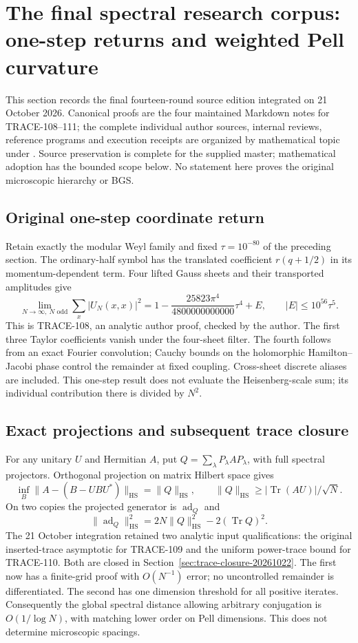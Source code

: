\section{The final spectral research corpus: one-step returns and weighted Pell curvature}
\label{sec:spectral-final-20261021}

This section records the final fourteen-round source edition integrated on
21 October 2026. Canonical proofs are the four maintained Markdown notes
for TRACE-108--111; the complete individual author sources, internal reviews,
reference programs and execution receipts are organized by mathematical topic
under . Source preservation is complete
for the supplied master; mathematical adoption has the bounded scope below.
No statement here proves the original microscopic hierarchy or BGS.

\subsection{Original one-step coordinate return}
Retain exactly the modular Weyl family and fixed $\tau=10^{-80}$ of the
preceding section. The ordinary-half symbol has the translated coefficient
$r(q+1/2)$ in its momentum-dependent term. Four lifted Gauss sheets and
their transported amplitudes give
\[
\lim_{N\to\infty,\ N\text{ odd}}\sum_x|U_N(x,x)|^2
=1-\frac{25823\pi^4}{4800000000000}\tau^4+E,
\qquad |E|\le10^{56}\tau^5.
\]
This is TRACE-108, an analytic author proof, checked by the author. The first three
Taylor coefficients vanish under the four-sheet filter. The fourth follows
from an exact Fourier convolution; Cauchy bounds on the holomorphic
Hamilton--Jacobi phase control the remainder at fixed coupling. Cross-sheet
discrete aliases are included. This one-step result does not evaluate the
Heisenberg-scale sum; its individual contribution there is divided by $N^2$.

\subsection{Exact projections and subsequent trace closure}
For any unitary $U$ and Hermitian $A$, put
$Q=\sum_\lambda P_\lambda AP_\lambda$, with full spectral projectors.
Orthogonal projection on matrix Hilbert space gives
\[
\inf_B\|A-(B-UBU^*)\|_{\mathrm{HS}}=\|Q\|_{\mathrm{HS}},\qquad
\|Q\|_{\mathrm{HS}}\ge |\operatorname{Tr}(AU)|/\sqrt N.
\]
On two copies the projected generator is $\operatorname{ad}_Q$ and
\[
\|\operatorname{ad}_Q\|_{\mathrm{HS}}^2
=2N\|Q\|_{\mathrm{HS}}^2-2(\operatorname{Tr}Q)^2.
\]
The 21 October integration retained two analytic input qualifications:
the original inserted-trace asymptotic for TRACE-109 and the uniform
power-trace bound for TRACE-110. Both are closed in
Section~\ref{sec:trace-closure-20261022}. The first now has a finite-grid
proof with $O(N^{-1})$ error; no uncontrolled remainder is differentiated.
The second has one dimension threshold for all positive iterates.
Consequently the global spectral distance allowing arbitrary conjugation
is $O(1/\log N)$, with matching lower order on Pell dimensions.
This does not determine microscopic spacings.

